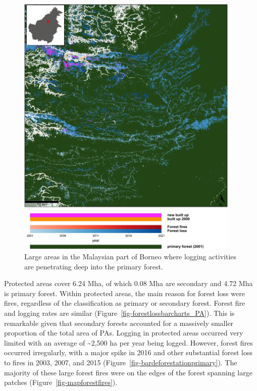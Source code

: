 \documentclass[
  letterpaper,
  DIV=11,
  numbers=noendperiod]{scrreprt}
\begin{document}
\begin{figure}[H]

{\centering \includegraphics[width=0.95\textwidth,height=\textheight]{text/../code/results/maps/primary_deforestation.png}

}

\caption{\label{fig-map_deforestation_primary}Large areas in the
Malaysian part of Borneo where logging activities are penetrating deep
into the primary forest.}

\end{figure}

Protected areas cover 6.24 Mha, of which 0.08 Mha are secondary and 4.72
Mha is primary forest. Within protected areas, the main reason for
forest loss were fires, regardless of the classification as primary or
secondary forest. Forest fire and logging rates are similar
(Figure~\ref{fig-forestlossbarcharts_PA}). This is remarkable given that
secondary forests accounted for a massively smaller proportion of the
total area of PAs. Logging in protected areas occurred very limited with
an average of \textasciitilde2,500 ha per year being logged. However,
forest fires occurred irregularly, with a major spike in 2016 and other
substantial forest loss to fires in 2003, 2007, and 2015
(Figure~\ref{fig-bardeforestationprimary}). The majority of these large
forest fires were on the edges of the forest spanning large patches
(Figure~\ref{fig-mapforestfires}).
\end{document}
